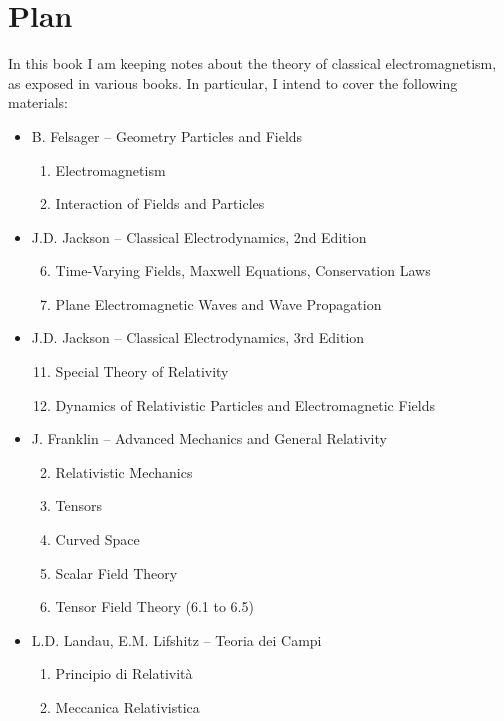 \chapter*{Plan}
\label{plan} 

In this book I am keeping notes about the theory of classical electromagnetism, 
as exposed in various books. In particular, I intend to cover the following materials:

\begin{itemize}

\item B. Felsager -- Geometry Particles and Fields
\begin{enumerate}
\setcounter{enumi}{0}
\item Electromagnetism
\item Interaction of Fields and Particles
\end{enumerate}

\item J.D. Jackson -- Classical Electrodynamics, 2nd Edition
\begin{enumerate}
\setcounter{enumi}{5}
\item Time-Varying Fields, Maxwell Equations, Conservation Laws
\item Plane Electromagnetic Waves and Wave Propagation
\end{enumerate}

\item J.D. Jackson -- Classical Electrodynamics, 3rd Edition
\begin{enumerate}
\setcounter{enumi}{10}
\item Special Theory of Relativity
\item Dynamics of Relativistic Particles and Electromagnetic Fields
\end{enumerate}

\item J. Franklin -- Advanced Mechanics and General Relativity
\begin{enumerate}
\setcounter{enumi}{1}
\item Relativistic Mechanics
\item Tensors
\item Curved Space
\item Scalar Field Theory
\item Tensor Field Theory (6.1 to 6.5)
\end{enumerate}

\item L.D. Landau, E.M. Lifshitz -- Teoria dei Campi
\begin{enumerate}
\setcounter{enumi}{0}
\item Principio di Relatività
\item Meccanica Relativistica
\end{enumerate}


\end{itemize}
